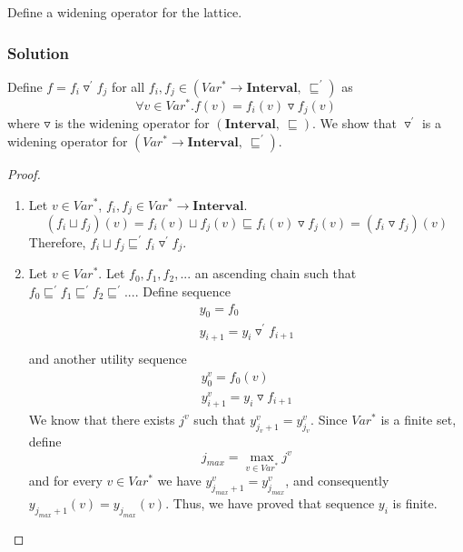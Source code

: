 Define a widening operator for the lattice.

\subsubsection*{Solution}
Define $f=f_i\triangledown^{'} f_j$ for all $f_i,f_j\in (Var^* \rightarrow \mathbf{Interval},\ \sqsubseteq^{'})$ as
\begin{equation*}
\forall v\in Var^*.f(v)=f_i(v)\triangledown f_j(v)
\end{equation*}
where $\triangledown$ is the widening operator for $(\mathbf{Interval},\ \sqsubseteq)$. We show that $\triangledown^{'}$ is a widening operator for $(Var^* \rightarrow \mathbf{Interval},\ \sqsubseteq^{'})$.
\begin{proof}
	\begin{enumerate}
	\item Let $v\in Var^*$, $f_i,f_j\in Var^* \rightarrow \mathbf{Interval}$.\\
	\begin{equation*}
	(f_i\sqcup f_j)(v)=f_i(v)\sqcup f_j(v)\sqsubseteq f_i(v)\triangledown f_j(v)=(f_i\triangledown f_j)(v)
	\end{equation*}
	Therefore, $f_i\sqcup f_j\sqsubseteq^{'} f_i\triangledown^{'} f_j$.
	\item Let $v\in Var^*$. Let $f_0,f_1,f_2,...$ an ascending chain such that $f_0\sqsubseteq^{'}f_1\sqsubseteq^{'}f_2\sqsubseteq^{'}...$. Define sequence
	\begin{align*}
	y_0=f_0 \\
	y_{i+1}=y_i\triangledown^{'} f_{i+1}\\
	\end{align*}
	and another utility sequence
	\begin{align*}
	y_0^v=f_0(v) \\
	y_{i+1}^v=y_i\triangledown f_{i+1}
	\end{align*}
	We know that there exists $j^v$ such that $y_{j_v+1}^v=y_{j_v}^v$. Since $Var^*$ is a finite set, define
	\begin{equation*}
	j_{max}=\max\limits_{v\in Var^*}j^v
	\end{equation*}
	and for every $v\in Var^*$ we have $y_{j_{max}+1}^v=y_{j_{max}}^v$, and consequently $y_{j_{max}+1}(v)=y_{j_{max}}(v)$. Thus, we have proved that sequence $y_i$ is finite.
	\end{enumerate}
\end{proof}